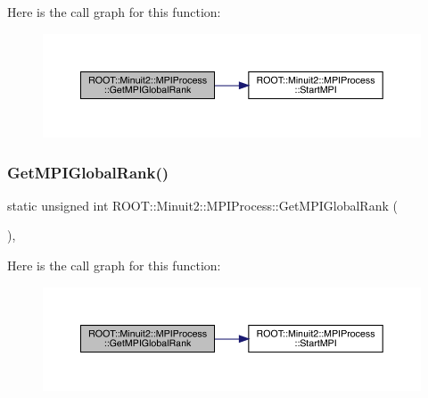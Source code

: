 Here is the call graph for this function\+:
\nopagebreak
\begin{figure}[H]
\begin{center}
\leavevmode
\includegraphics[width=350pt]{dc/d43/classROOT_1_1Minuit2_1_1MPIProcess_aa7c524a7980698bf9bba3a652e2f9a13_cgraph}
\end{center}
\end{figure}
\mbox{\label{classROOT_1_1Minuit2_1_1MPIProcess_aa7c524a7980698bf9bba3a652e2f9a13}} 
\subsubsection{\texorpdfstring{GetMPIGlobalRank()}{GetMPIGlobalRank()}\hspace{0.1cm}{\footnotesize\ttfamily [2/2]}}
{\footnotesize\ttfamily static unsigned int R\+O\+O\+T\+::\+Minuit2\+::\+M\+P\+I\+Process\+::\+Get\+M\+P\+I\+Global\+Rank (\begin{DoxyParamCaption}{ }\end{DoxyParamCaption})\hspace{0.3cm}{\ttfamily [inline]}, {\ttfamily [static]}}

Here is the call graph for this function\+:
\nopagebreak
\begin{figure}[H]
\begin{center}
\leavevmode
\includegraphics[width=350pt]{dc/d43/classROOT_1_1Minuit2_1_1MPIProcess_aa7c524a7980698bf9bba3a652e2f9a13_cgraph}
\end{center}
\end{figure}
\mbox{\label{classROOT_1_1Minuit2_1_1MPIProcess_acfa3106122ad8f8c7d6bb3777c3d1ccc}} 
